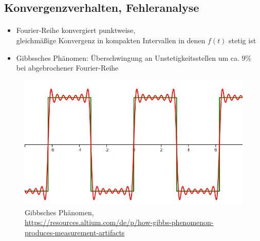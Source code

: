 \subsection{Konvergenzverhalten, Fehleranalyse}
\begin{frame}{\insertsection}
	\framesubtitle{\insertsubsection}
	\begin{itemize}
		\vspace{1em}
		\item Fourier-Reihe konvergiert punktweise,
		\\ gleichmäßige Konvergenz in kompakten Intervallen in denen $f(t)$ stetig ist
		\item Gibbssches Phänomen: Überschwingung an Unstetigkeitsstellen um ca. $9\%$ bei abgebrochener Fourier-Reihe
	\end{itemize}
	\begin{figure}
		\centering
		\includegraphics[scale=0.15]{images/gibbs.png}
		\caption*{\centering Gibbsches Phänomen, \\ \href{https://resources.altium.com/de/p/how-gibbs-phenomenon-produces-measurement-artifacts}{https://resources.altium.com/de/p/how-gibbs-phenomenon-produces-measurement-artifacts}}
	\end{figure}
\end{frame}

